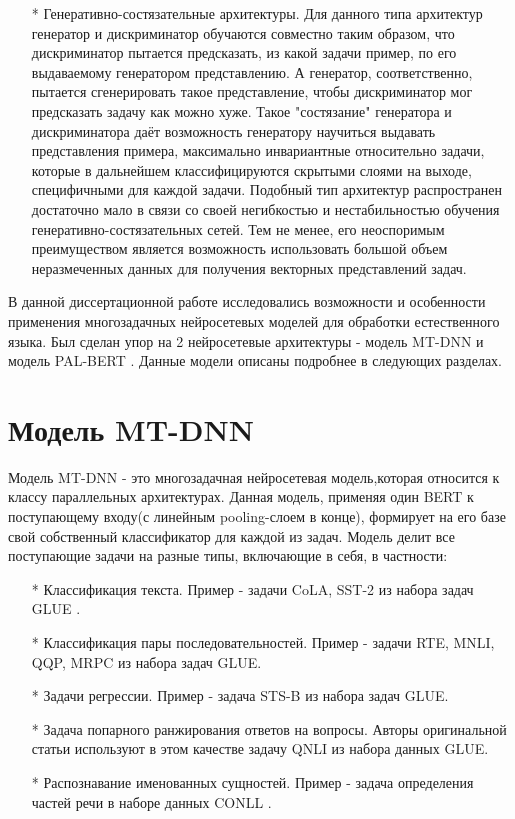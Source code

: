 \begin{itemize}
\item[*] Генеративно-состязательные архитектуры. Для данного типа архитектур генератор и дискриминатор обучаются совместно таким образом, что дискриминатор пытается предсказать, из какой задачи пример, по его выдаваемому генератором представлению. А генератор, соответственно, пытается сгенерировать такое представление, чтобы дискриминатор мог предсказать задачу как можно хуже. Такое "состязание" генератора и дискриминатора даёт возможность генератору научиться выдавать представления примера, максимально инвариантные относительно задачи, которые в дальнейшем классифицируются скрытыми слоями на выходе, специфичными для каждой задачи. Подобный тип архитектур распространен достаточно мало в связи со своей негибкостью и нестабильностью обучения генеративно-состязательных сетей. Тем не менее, его неоспоримым преимуществом является возможность использовать большой объем неразмеченных данных для получения векторных представлений задач. 
\end{itemize}

В данной диссертационной работе исследовались возможности и особенности применения многозадачных нейросетевых моделей для обработки естественного языка. Был сделан упор на 2 нейросетевые архитектуры - модель MT-DNN \cite{mtdnn} и модель PAL-BERT \cite{stickland_2019}. Данные модели описаны подробнее в следующих разделах.

\section{Модель MT-DNN}\label{ch:mtl:mtdnn}
Модель MT-DNN - это многозадачная нейросетевая модель,которая относится к классу параллельных архитектурах. Данная модель, применяя один BERT к поступающему входу(с линейным pooling-слоем в конце), формирует на его базе свой собственный классификатор для каждой из задач. Модель делит все поступающие задачи на разные типы, включающие в себя, в частности:
\begin{itemize}
\item[*] Классификация текста. Пример - задачи CoLA, SST-2 из набора задач GLUE \cite{wang_2018}.
\item[*] Классификация пары последовательностей. Пример - задачи RTE, MNLI, QQP, MRPC из набора задач GLUE. 
\item[*] Задачи регрессии. Пример - задача STS-B из набора задач GLUE. 
\item[*] Задача попарного ранжирования ответов на вопросы. Авторы оригинальной статьи используют в этом качестве задачу QNLI из набора данных GLUE.
\item[*] Распознавание именованных сущностей. Пример - задача определения частей речи в наборе данных CONLL \cite{sang_2003}. 
\end{itemize}

